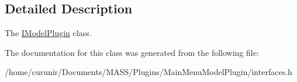 \subsection{Detailed Description}
The \hyperlink{class_i_model_plugin}{I\+Model\+Plugin} class. 

The documentation for this class was generated from the following file\+:\begin{DoxyCompactItemize}
\item 
/home/curunir/\+Documents/\+M\+A\+S\+S/\+Plugins/\+Main\+Menu\+Model\+Plugin/interfaces.\+h\end{DoxyCompactItemize}
